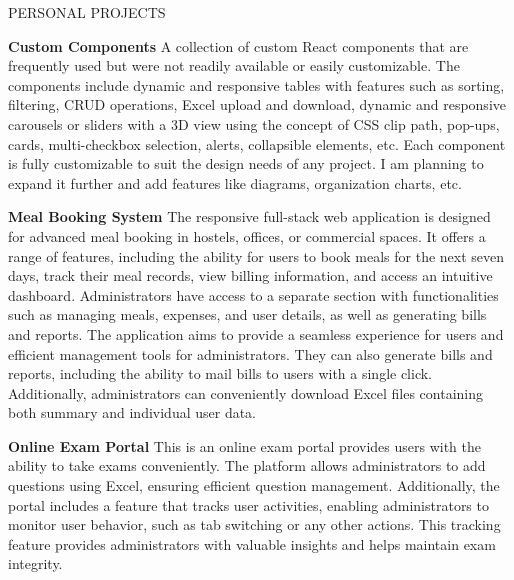 \documentclass{resume} %
\begin{document}

\begin{rSection}{PERSONAL PROJECTS}
\vspace{-1.25em}


\item \textbf{Custom Components}
\href{https://custom-components-orpin.vercel.app/}{\faExternalLink}
{A collection of custom React components that are frequently used but were not readily available or easily customizable. The components include dynamic and responsive tables with features such as sorting, filtering, CRUD operations, Excel upload and download, dynamic and responsive carousels or sliders with a 3D view using the concept of CSS clip path, pop-ups, cards, multi-checkbox selection, alerts, collapsible elements, etc. Each component is fully customizable to suit the design needs of any project. I am planning to expand it further and add features like diagrams, organization charts, etc.}



\item \textbf{Meal Booking System}
\href{https://meal-booking-system.vercel.app/}{\faExternalLink}
{
The responsive full-stack web application is designed for advanced meal booking in hostels, offices, or commercial spaces. It offers a range of features, including the ability for users to book meals for the next seven days, track their meal records, view billing information, and access an intuitive dashboard. Administrators have access to a separate section with functionalities such as managing meals, expenses, and user details, as well as generating bills and reports. The application aims to provide a seamless experience for users and efficient management tools for administrators. They can also generate bills and reports, including the ability to mail bills to users with a single click. Additionally, administrators can conveniently download Excel files containing both summary and individual user data.}





\item \textbf{Online Exam Portal}
\href{https://react-online-exam-portal.vercel.app/}{\faExternalLink}
{
This is an online exam portal provides users with the ability to take exams conveniently. The platform allows administrators to add questions using Excel, ensuring efficient question management. Additionally, the portal includes a feature that tracks user activities, enabling administrators to monitor user behavior, such as tab switching or any other actions. This tracking feature provides administrators with valuable insights and helps maintain exam integrity.}





\end{rSection}
\end{document}
